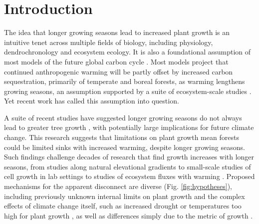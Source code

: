 \documentclass[11pt]{article}
\begin{document}
\section*{Introduction} %

The idea that longer growing seasons lead to increased plant growth is an intuitive tenet across multiple fields of biology, including physiology, dendrochronology \citep{frank2022dendrochronology} and ecosystem ecology. It is also a foundational assumption of most models of the future global carbon cycle \citep[e.g.][]{friedlingstein2022global, ito2020global}. Most models project that continued anthropogenic warming will be partly offset by increased carbon sequestration, primarily of temperate and boreal forests, as warming lengthens growing seasons, an assumption supported by a suite of ecosystem-scale studies \citep{chen1999effects,keenan2014net,finzi2020}. Yet recent work has called this assumption into question.

A suite of recent studies have suggested longer growing seasons do not always lead to greater tree growth \citep{dow2022warm,green2022limits,silvestro2023longer}, with potentially large implications for future climate change. This research suggests that limitations on plant growth mean forests could be limited sinks with increased warming, despite longer growing seasons. Such findings challenge decades of research that find growth increases with longer seasons, from studies along natural elevational gradients to small-scale studies of cell growth in lab settings to studies of ecosystem fluxes with warming \citep{chen1999effects,keenan2014net,finzi2020}. Proposed mechanisms for the apparent disconnect are diverse (Fig. \ref{fig:hypotheses}), including previously unknown internal limits on plant growth \citep{zohner2023effect} and the complex effects of climate change itself, such as increased drought or temperatures too high for plant growth \citep{dow2022warm}, as well as differences simply due to the metric of growth \citep{green2022limits}.
\end{document}
